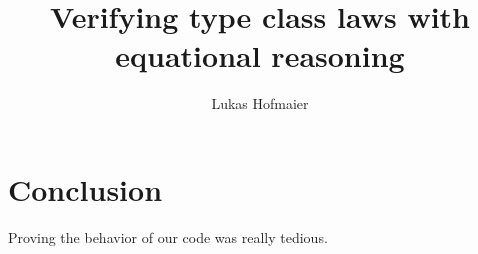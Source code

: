 \documentclass[twoside, a4paper, x11names]{article}
\author{Lukas Hofmaier}
\title{Verifying type class laws with equational reasoning}
\begin{document}
\maketitle




\printglossary
%
%
%

\section{Conclusion}
\label{sec:conclusion}
Proving the behavior of our code was really tedious.


\end{document}
